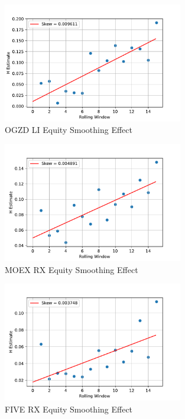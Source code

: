     \begin{figure}[h]
        \centering
        \includegraphics[width=0.7\textwidth]{fig/OGZD LI Equity Smoothing Effect.pdf}
        \caption{OGZD LI Equity Smoothing Effect}
    \end{figure} 

    \begin{figure}[h]
        \centering
        \includegraphics[width=0.7\textwidth]{fig/MOEX RX Equity Smoothing Effect.pdf}
        \caption{MOEX RX Equity Smoothing Effect}
    \end{figure} 

    \begin{figure}[h]
        \centering
        \includegraphics[width=0.7\textwidth]{fig/FIVE RX Equity Smoothing Effect.pdf}
        \caption{FIVE RX Equity Smoothing Effect}
    \end{figure}  


